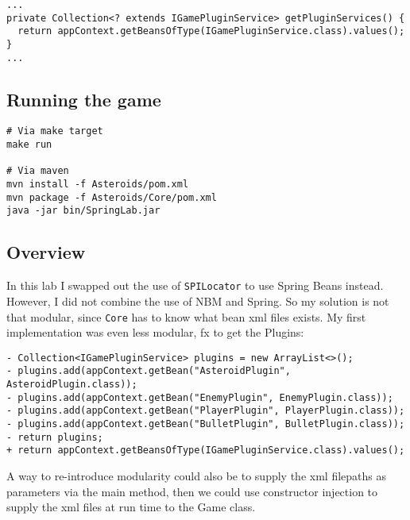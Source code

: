 \begin{verbatim}
...
private Collection<? extends IGamePluginService> getPluginServices() {
  return appContext.getBeansOfType(IGamePluginService.class).values();
}
...
\end{verbatim}


\subsection{Running the game}
\begin{verbatim}
# Via make target
make run

# Via maven
mvn install -f Asteroids/pom.xml
mvn package -f Asteroids/Core/pom.xml
java -jar bin/SpringLab.jar
\end{verbatim}

\subsection{Overview}
In this lab I swapped out the use of \texttt{SPILocator} to use Spring Beans
instead. However, I did not combine the use of NBM and Spring. So my solution is
not that modular, since \texttt{Core} has to know what bean xml files exists.
My first implementation was even less modular, fx to get the Plugins:

\begin{verbatim}
- Collection<IGamePluginService> plugins = new ArrayList<>();
- plugins.add(appContext.getBean("AsteroidPlugin", AsteroidPlugin.class));
- plugins.add(appContext.getBean("EnemyPlugin", EnemyPlugin.class));
- plugins.add(appContext.getBean("PlayerPlugin", PlayerPlugin.class));
- plugins.add(appContext.getBean("BulletPlugin", BulletPlugin.class));
- return plugins;
+ return appContext.getBeansOfType(IGamePluginService.class).values();
\end{verbatim}

A way to re-introduce modularity could also be to supply the xml filepaths as 
parameters via the main method, then we could use constructor injection to supply
the xml files at run time to the Game class.

